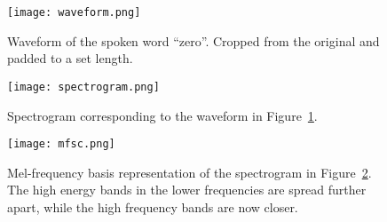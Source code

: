 \begin{figure}
\centering
\texttt{[image: waveform.png]}
\caption{Waveform of the spoken word ``zero''. Cropped from the original and padded to a set length.}
\label{fig:waveform}
\end{figure}


\begin{figure}
\centering
\texttt{[image: spectrogram.png]}
\caption{Spectrogram corresponding to the waveform in Figure~\ref{fig:waveform}.}
\label{fig:spectrogram}
\end{figure}





\begin{figure}
\centering
\texttt{[image: mfsc.png]}
\caption{Mel-frequency basis representation of the spectrogram in Figure~\ref{fig:spectrogram}. The high energy bands in the lower frequencies are spread further apart, while the high frequency bands are now closer.}
\label{fig:mfsc}
\end{figure}















